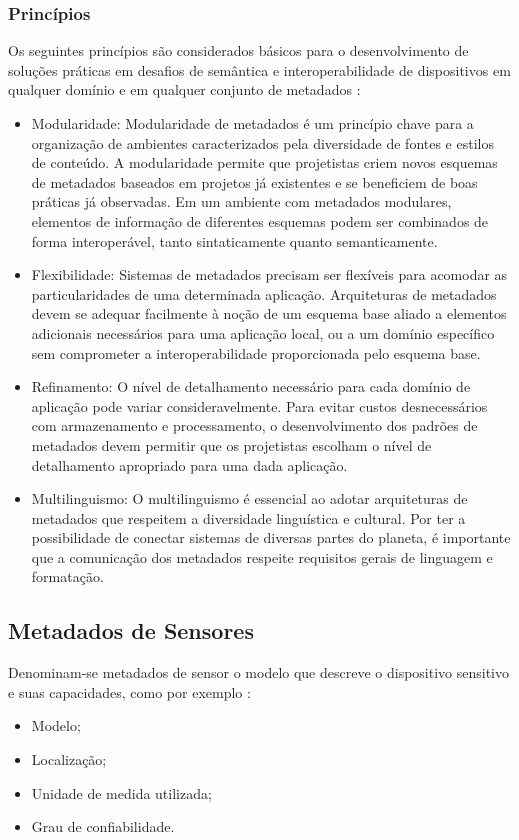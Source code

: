 		\subsubsection{Princípios}
    \quad Os seguintes princípios são considerados básicos para o desenvolvimento de soluções práticas em desafios de semântica
    e interoperabilidade de dispositivos em qualquer domínio e em qualquer conjunto de metadados \cite{metadata}:
		\begin{itemize}
		  \item Modularidade: Modularidade de metadados é um princípio chave para a organização de ambientes caracterizados pela diversidade de fontes e estilos
      de conteúdo. A modularidade permite que projetistas criem novos esquemas de metadados baseados em projetos
      já existentes e se beneficiem de boas práticas já observadas. Em um ambiente com metadados modulares, elementos de informação de diferentes esquemas
      podem ser combinados de forma interoperável, tanto sintaticamente quanto semanticamente.
      \item Flexibilidade: Sistemas de metadados precisam ser flexíveis para acomodar as particularidades de uma determinada aplicação.
      Arquiteturas de metadados devem se adequar facilmente à noção de um esquema base aliado a elementos adicionais necessários para uma aplicação local, ou a um
      domínio específico sem comprometer a interoperabilidade proporcionada pelo esquema base.
      \item Refinamento: O nível de detalhamento necessário para cada domínio de aplicação pode variar consideravelmente. Para evitar custos
      desnecessários com armazenamento e processamento, o desenvolvimento dos padrões de metadados devem permitir que os projetistas
      escolham o nível de detalhamento apropriado para uma dada aplicação.
      \item Multilinguismo: O multilinguismo é essencial ao adotar arquiteturas de metadados que respeitem a diversidade linguística e cultural.
      Por ter a possibilidade de conectar sistemas de diversas partes do planeta, é importante que a comunicação dos metadados respeite requisitos gerais de linguagem e formatação.
		\end{itemize}
  \subsection{Metadados de Sensores}
    \quad Denominam-se metadados de sensor o modelo que descreve o dispositivo sensitivo e suas capacidades, como por exemplo \cite{SML}:
    \begin{itemize}
      \item Modelo;
      \item Localização;
      \item Unidade de medida utilizada;
      \item Grau de confiabilidade.
    \end{itemize}

